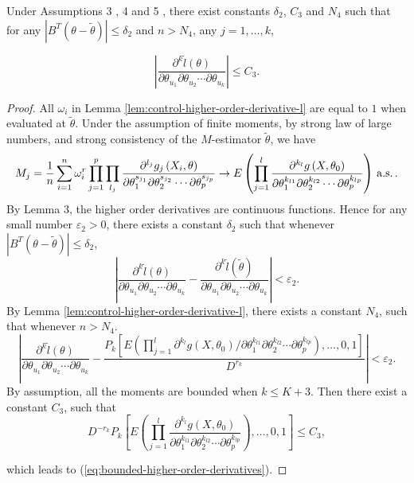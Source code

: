 \begin{lemma}
\label{lem:bounded-high-order-der-2} Under Assumptions 3 , 4 and 5 ,
there exist constants $\delta_{2}$, $C_{3}$ and $N_{4}$ such that
for any $\left|B^T\left(\theta-\tilde{\theta}\right)\right|\le\delta_{2}$
and $n>N_{4}$, any $j=1,\ldots,k$,%
\begin{comment}
need add consistency conditions for M-Estimator
\end{comment}
{} 
\begin{equation}
\left|\frac{\partial^{k}\tilde{l}\left(\theta\right)}{\partial\theta_{u_{1}}\partial\theta_{u_{2}}\cdots\partial\theta_{u_{k}}}\right|\le C_{3}.\label{eq:bounded-higher-order-derivatives}
\end{equation}
\end{lemma}
\begin{proof}
All $\omega_{i}$ in Lemma \ref{lem:control-higher-order-derivative-l}
are equal to $1$ when evaluated at $\tilde{\theta}$. Under the assumption
of finite moments, by strong law of large numbers, and strong consistency
of the $M$-estimator $\tilde{\theta}$, we have 
\[
M_{j}=\frac{1}{n}\sum_{i=1}^{n}\omega_{i}^{r}\prod_{j=1}^{p}\prod_{l_{j}}\frac{\partial^{l_{j}}g_{j}\left(X_{i},\theta\right)}{\partial\theta_{1}^{s_{j_{1}}}\partial\theta_{2}^{s_{j_{2}}}\cdots\partial\theta_{p}^{s_{j_{p}}}}
\rightarrow E\left(\prod_{j=1}^{l}\frac{\partial^{k_{l}}g\left(X,\theta_{0}\right)}{\partial\theta_{1}^{k_{l1}}\partial\theta_{2}^{k_{l2}}\cdots\partial\theta_{p}^{k_{lp}}}\right)\,\mathrm{a.s.}\,.
\]
 By Lemma 3, the higher order
derivatives are continuous functions. Hence for any small number $\varepsilon_{2}>0$,
there exists a constant $\delta_{2}$ such that whenever $\left|B^T\left(\theta-\tilde{\theta}\right)\right|\le\delta_{2}$,
\[
\left|\frac{\partial^{k}\tilde{l}\left(\theta\right)}{\partial\theta_{u_{1}}\partial\theta_{u_{2}}\cdots\partial\theta_{u_{k}}}-\frac{\partial^{k}\tilde{l}\left(\tilde{\theta}\right)}{\partial\theta_{u_{1}}\partial\theta_{u_{2}}\cdots\partial\theta_{u_{k}}}\right|<\varepsilon_{2}.
\]
By Lemma \ref{lem:control-higher-order-derivative-l}, there exists
a constant $N_{4}$, such that whenever $n>N_{4}$. 
\[
\left|\frac{\partial^{k}\tilde{l}\left(\theta\right)}{\partial\theta_{u_{1}}\partial\theta_{u_{2}}\cdots\partial\theta_{u_{k}}}-
\frac{P_{k}\left[ E\left(\prod_{j=1}^{l} \partial^{k_{l}}g\left(X,\theta_{0}\right) / \partial\theta_{1}^{k_{l1}}\partial\theta_{2}^{k_{l2}}\cdots\partial\theta_{p}^{k_{lp}} \right) ,\ldots,0,1\right]}{D^{r_{k}}}\right|
<\varepsilon_{2}.
\]
By assumption, all the moments are bounded when $k\le K+3$.
Then there exist a constant $C_{3}$, such that 
\[
D^{-r_{k}}P_{k}\left[E\left(\prod_{j=1}^{l}\frac{\partial^{k_{l}}g\left(X,\theta_{0}\right)}{\partial\theta_{1}^{k_{l1}}\partial\theta_{2}^{k_{l2}}\cdots\partial\theta_{p}^{k_{lp}}}\right) ,\ldots,0,1\right]\le C_{3},
\]
\begin{comment}
change the length
\end{comment}
 which leads to (\ref{eq:bounded-higher-order-derivatives}). 
\end{proof}

